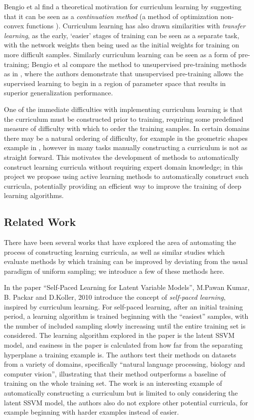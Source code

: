 \documentclass[a4paper,11pt]{article}
\begin{document}
Bengio et al \cite{Bengio 09} find a theoretical motivation for curriculum learning by suggesting that it can be seen as a \textit{continuation method} (a method of optimization non-convex functions \cite{Allgower 1980}). Curriculum learning has also drawn similarities with \textit{transfer learning}, as the early, `easier' stages of training can be seen as a separate task, with the network weights then being used as the initial weights for training on more difficult samples. Similarly curriculum learning can be seen as a form of pre-training; Bengio et al \cite{Bengio 09} compare the method to unsupervised pre-training methods as in \cite{Erhan 09}, where the authors demonstrate that unsupervised pre-training allows the supervised learning to begin in a region of parameter space that results in superior generalization performance. 

One of the immediate difficulties with implementing curriculum learning is that the curriculum must be constructed prior to training, requiring some predefined measure of difficulty with which to order the training samples. In certain domains there may be a natural ordering of difficulty, for example in the geometric shapes example in \cite{Bengio 09}, however in many tasks manually constructing a curriculum is not as straight forward. This motivates the development of methods to automatically construct learning curricula without requiring expert domain knowledge; in this project we propose using active learning methods to automatically construct such curricula, potentially providing an efficient way to improve the training of deep learning algorithms. 

\subsection*{Related Work}
There have been several works that have explored the area of automating the process of constructing learning curricula, as well as similar studies which evaluate methods by which training can be improved by deviating from the usual paradigm of uniform sampling; we introduce a few of these methods here.

In the paper ``Self-Paced Learning for Latent Variable Models'', M.Pawan Kumar, B. Packar and D.Koller, 2010 \cite{Koller 2010} introduce the concept of \textit{self-paced learning}, inspired by curriculum learning. For self-paced learning, after an initial training period, a learning algorithm is trained beginning with the ``easiest'' samples, with the number of included sampling slowly increasing until the entire training set is considered. The learning algorithm explored in the paper is the latent SSVM model, and easiness in the paper is calculated from how far from the separating hyperplane a training example is. The authors test their methods on datasets from a variety of domains, specifically ``natural language processing, biology and computer vision'', illustrating that their method outperforms a baseline of training on the whole training set. The work is an interesting example of automatically constructing a curriculum but is limited to only considering the latent SSVM model, the authors also do not explore other potential curricula, for example beginning with harder examples instead of easier.
\end{document}
